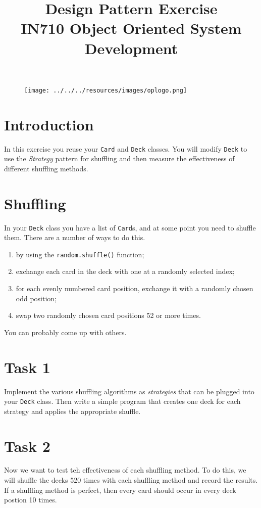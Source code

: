 \documentclass{article}
\begin{document}
\begin{figure}
\texttt{[image: ../../../resources/images/oplogo.png]}
\end{figure}

\title{Design Pattern Exercise\\IN710 Object Oriented System Development}
\date{}
\maketitle

\section*{Introduction}
In this exercise you reuse your \texttt{Card} and \texttt{Deck} classes.  
You will modify \texttt{Deck} to use the \emph{Strategy} 
pattern for shuffling and then measure the effectiveness of different 
shuffling methods.

\section{Shuffling}
In your \texttt{Deck} class you have a list of \texttt{Card}s, and at some 
point you need to shuffle them.  There are a number of ways to do this.

\begin{enumerate}
	\item by using the \texttt{random.shuffle()} function;
	\item exchange each card in the deck with one at a 
		randomly selected index;
	\item for each evenly numbered card position, exchange
		it with a randomly chosen odd position;
	\item swap two randomly chosen card positions 52 or more times.
\end{enumerate}

You can probably come up with others.

\section{Task 1}
Implement the various shuffling algorithms as \emph{strategies} that can be
plugged into your \texttt{Deck} class.  Then write a simple program that
creates one deck for each strategy and applies the appropriate shuffle.

\section{Task 2}
Now we want to test teh effectiveness of each shuffling method.  To do this,
we will shuffle the decks 520 times with each shuffling method and record the results.
If a shuffling method is perfect, then every card should occur in every deck postion
10 times.
\end{document}
